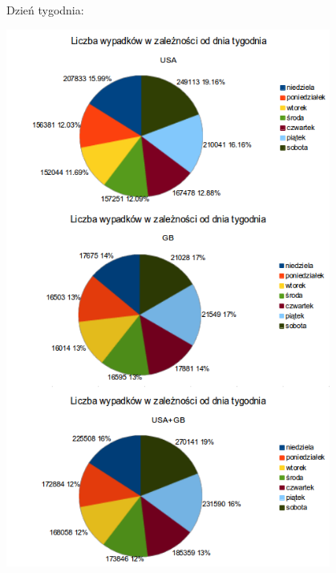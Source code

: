 Dzień
tygodnia:\\\centerline{\includegraphics[width=0.8\textwidth]{images/statistics/day_of_week.png}}

